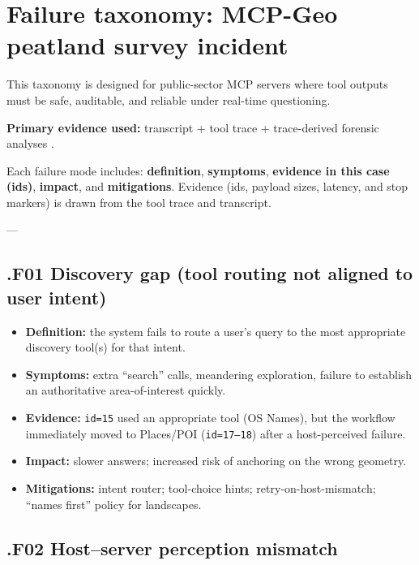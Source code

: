 \section{Failure taxonomy: MCP-Geo peatland survey incident}

This taxonomy is designed for public-sector MCP servers where tool outputs must be safe, auditable, and reliable under real-time questioning.

\textbf{Primary evidence used:} transcript + tool trace + trace-derived forensic analyses \cite{artefact_claude_stopped_after_ngd_features_2026_02_18,artefact_codex_trace_jsonl_2026_02_18,artefact_floor_question_analysis_2026_02_19,artefact_forensic_study_mcp_geo_2026_02_19}.

Each failure mode includes: \textbf{definition}, \textbf{symptoms}, \textbf{evidence in this case (ids)}, \textbf{impact}, and \textbf{mitigations}. Evidence (ids, payload sizes, latency, and stop markers) is drawn from the tool trace and transcript. \cite{artefact_codex_trace_jsonl_2026_02_18,artefact_claude_stopped_after_ngd_features_2026_02_18}

---

\subsection*{.F01 Discovery gap (tool routing not aligned to user intent)}

\begin{itemize}[leftmargin=*]
\item \textbf{Definition:} the system fails to route a user’s query to the most appropriate discovery tool(s) for that intent.
\item \textbf{Symptoms:} extra “search” calls, meandering exploration, failure to establish an authoritative area-of-interest quickly.
\item \textbf{Evidence:} \texttt{id=15} used an appropriate tool (OS Names), but the workflow immediately moved to Places/POI (\texttt{id=17–18}) after a host-perceived failure.
\item \textbf{Impact:} slower answers; increased risk of anchoring on the wrong geometry.
\item \textbf{Mitigations:} intent router; tool-choice hints; retry-on-host-mismatch; “names first” policy for landscapes.
\end{itemize}

\subsection*{.F02 Host–server perception mismatch}

